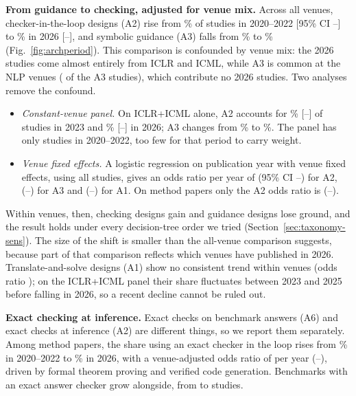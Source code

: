 

\textbf{From guidance to checking, adjusted for venue mix.} Across all venues, checker-in-the-loop designs (A2) rise from \% of studies in 2020--2022 [95\% CI --] to \% in 2026 [--], and symbolic guidance (A3) falls from \% to \% (Fig.~\ref{fig:archperiod}). This comparison is confounded by venue mix: the 2026 studies come almost entirely from ICLR and ICML, while A3 is common at the NLP venues ( of the  A3 studies), which contribute no 2026 studies. Two analyses remove the confound.
\begin{itemize}
  \item \emph{Constant-venue panel.} On ICLR+ICML alone, A2 accounts for \% [--] of studies in 2023 and \% [--] in 2026; A3 changes from \% to \%. The panel has only  studies in 2020--2022, too few for that period to carry weight.
  \item \emph{Venue fixed effects.} A logistic regression on publication year with venue fixed effects, using all studies, gives an odds ratio per year of  (95\% CI --) for A2,  (--) for A3 and  (--) for A1. On method papers only the A2 odds ratio is  (--).
\end{itemize}
Within venues, then, checking designs gain and guidance designs lose ground, and the result holds under every decision-tree order we tried (Section~\ref{sec:taxonomy-sens}). The size of the shift is smaller than the all-venue comparison suggests, because part of that comparison reflects which venues have published in 2026. Translate-and-solve designs (A1) show no consistent trend within venues (odds ratio ); on the ICLR+ICML panel their share fluctuates between 2023 and 2025 before falling in 2026, so a recent decline cannot be ruled out.

\textbf{Exact checking at inference.} Exact checks on benchmark answers (A6) and exact checks at inference (A2) are different things, so we report them separately. Among method papers, the share using an exact checker in the loop rises from \% in 2020--2022 to \% in 2026, with a venue-adjusted odds ratio of  per year (--), driven by formal theorem proving and verified code generation. Benchmarks with an exact answer checker grow alongside, from  to  studies.

